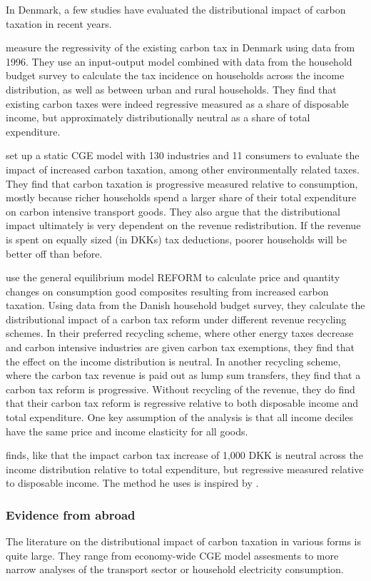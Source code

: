 In Denmark, a few studies have evaluated the distributional impact of carbon taxation in recent years.

\cite{Wier2005} measure the regressivity of the existing carbon tax in Denmark using data from 1996. They use an input-output model combined with data from the household budget survey to calculate the tax incidence on households across the income distribution, as well as between urban and rural households. They find that existing carbon taxes were indeed regressive measured as a share of disposable income, but approximately distributionally neutral as a share of total expenditure. 

\cite{dmoer2009} set up a static CGE model with 130 industries and 11 consumers to evaluate the impact of increased carbon taxation, among other environmentally related taxes. They find that carbon taxation is progressive measured relative to consumption, mostly because richer households spend a larger share of their total expenditure on carbon intensive transport goods. They also argue that the distributional impact ultimately is very dependent on the revenue redistribution. If the revenue is spent on equally sized (in DKKs) tax deductions, poorer households will be better off than before. 

\cite{Kraka2020} use the general equilibrium model REFORM to calculate price and quantity changes on consumption good composites resulting from increased carbon taxation. Using data from the Danish household budget survey, they calculate the distributional impact of a carbon tax reform under different revenue recycling schemes. In their preferred recycling scheme, where other energy taxes decrease and carbon intensive industries are given carbon tax exemptions, they find that the effect on the income distribution is neutral. In another recycling scheme, where the carbon tax revenue is paid out as lump sum transfers, they find that a carbon tax reform is progressive. Without recycling of the revenue, they do find that their carbon tax reform is regressive relative to both disposable income and total expenditure. One key assumption of the analysis is that all income deciles have the same price and income elasticity for all goods. 

\cite{sune2020} finds, like \cite{Wier2005} that the impact carbon tax increase of 1,000 DKK is neutral across the income distribution relative to total expenditure, but regressive measured relative to disposable income. The method he uses is inspired by \cite{Wier2005}.
\subsubsection{Evidence from abroad}
The literature on the distributional impact of carbon taxation in various forms is quite large. They range from economy-wide CGE model assesments to more narrow analyses of the transport sector or household electricity consumption. 


